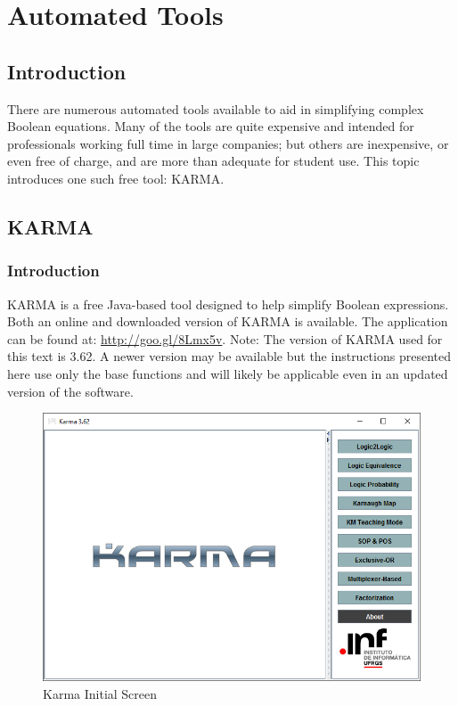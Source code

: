 \clearpage\section{Automated Tools}
\label{ASM:sec:automated_tools}

\subsection{Introduction}
\label{ASM:subsec:introduction_to_automated_tools}

There are numerous automated tools available to aid in simplifying complex Boolean equations. Many of the tools are quite expensive and intended for professionals working full time in large companies; but others are inexpensive, or even free of charge, and are more than adequate for student use. This topic introduces one such free tool: \ac{KARMA}. 

\subsection{KARMA}
\label{ASM:subsec:karma}

\subsubsection{Introduction}
\label{ASM:subsubsec:introduction_to_karma}

\ac{KARMA} is a free Java-based tool designed to help simplify Boolean expressions. Both an online and downloaded version of \ac{KARMA} is available. The application can be found at: \url{http://goo.gl/8Lmx5v}. Note: The version of \ac{KARMA} used for this text is 3.62. A newer version may be available but the instructions presented here use only the base functions and will likely be applicable even in an updated version of the software.

\begin{figure}[H]
	\centering
	\includegraphics[width=\maxwidth{.95\linewidth}]{gfx/07_01}
	\caption{Karma Initial Screen}
	\label{fig:07_01}
\end{figure}

